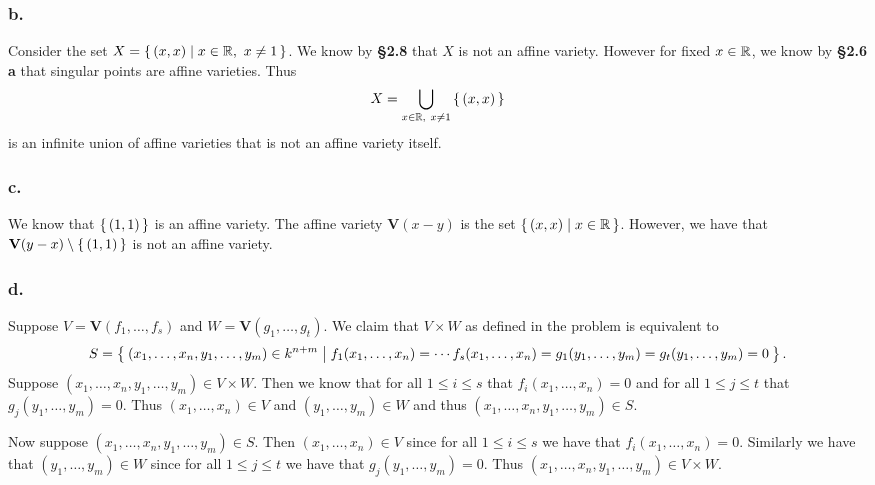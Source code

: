 \documentclass[letterpaper]{article}
\begin{document}
\subsubsection*{b.}

Consider the set $X = \set{(x, x) | x \in \mathbb{R},~ x \neq 1}$.
We know by \textbf{\S 2.8} that $X$ is not an affine variety.
However for fixed $x \in \mathbb{R}$, we know by \textbf{\S 2.6 a} that singular points are affine varieties.
Thus
\[
  X = \bigcup_{x \in \mathbb{R},~ x \neq 1}\set{(x, x)}
\]
is an infinite union of affine varieties that is not an affine variety itself.

\subsubsection*{c.}

We know that $\set{(1, 1)}$ is an affine variety.
The affine variety $\textbf{V}(x - y)$ is the set $\set{(x, x) | x \in \mathbb{R}}$.
However, we have that $\textbf{V}(y - x) \setminus \set{(1, 1)}$ is not an affine variety.


\subsubsection*{d.}

Suppose $V = \textbf{V}(f_{1}, \ldots, f_{s})$ and $W = \textbf{V}(g_{1}, \ldots, g_{t})$.
We claim that $V \times W$ as defined in the problem is equivalent to
\[
  S = \Set{(x_{1}, \ldots, x_{n}, y_{1}, \ldots, y_{m}) \in k^{n + m} | f_{1}(x_{1}, \ldots, x_{n}) = \cdots f_{s}(x_{1}, \ldots, x_{n}) = g_{1}(y_{1}, \ldots, y_{m}) = g_{t}(y_{1}, \ldots, y_{m}) = 0}.
\]
Suppose $(x_{1}, \ldots, x_{n}, y_{1}, \ldots, y_{m}) \in V \times W$.
Then we know that for all $1 \leq i \leq s$ that $f_{i}(x_{1}, \ldots, x_{n}) = 0$ and for all $1 \leq j \leq t$ that $g_{j}(y_{1}, \ldots, y_{m}) = 0$.
Thus $(x_{1}, \ldots, x_{n}) \in V$ and $(y_{1}, \ldots, y_{m}) \in W$ and thus $(x_{1}, \ldots, x_{n}, y_{1}, \ldots, y_{m}) \in S$.


Now suppose $(x_{1}, \ldots, x_{n}, y_{1}, \ldots, y_{m}) \in S$.
Then $(x_{1}, \ldots, x_{n}) \in V$ since for all $1 \leq i \leq s$ we have that $f_{i}(x_{1}, \ldots, x_{n}) = 0$.
Similarly we have that $(y_{1}, \ldots, y_{m}) \in W$ since for all $1 \leq j \leq t$ we have that $g_{j}(y_{1}, \ldots, y_{m}) = 0$.
Thus  $(x_{1}, \ldots, x_{n}, y_{1}, \ldots, y_{m}) \in V \times W$.

\clearpage

\end{document}
